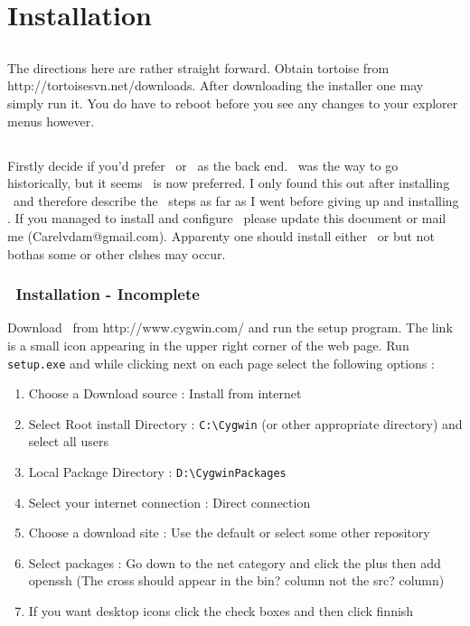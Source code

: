 \section{Installation}

\subsection{\svn}

The directions here are rather straight forward. Obtain tortoise from http://tortoisesvn.net/downloads. After downloading the installer one may simply run it. You do have to reboot before you see any changes to your explorer menus however.

\subsection{\git}

Firstly decide if you'd prefer \msys\ or \cyg\ as the back end. \cyg\ was the way to go historically, but it seems \msys\ is now preferred. I only found this out after installing \cyg\ and therefore describe the \cyg\ steps as far as I went before giving up and installing \msys. If you managed to install and configure \cyg\ please update this document or mail me (Carelvdam@gmail.com). Apparenty one should install either \cyg\ or \msys but not bothas some or other clshes may occur.

\subsubsection{\cyg\ Installation - Incomplete}

Download \cyg\ from http://www.cygwin.com/ and run the setup program. The link is a small icon appearing in the upper right corner of the web page. Run \verb|setup.exe| and while clicking next on each page select the following options : 
\begin{enumerate}
\item Choose a Download source : Install from internet
\item Select Root install Directory : \verb|C:\Cygwin| (or other appropriate directory) and select all users
\item Local Package Directory : \verb|D:\CygwinPackages|
\item Select your internet connection : Direct connection
\item Choose a download site : Use the default or select some other repository
\item Select packages : Go down to the net category and click the plus then add openssh (The cross should appear in the bin? column not the src? column)
\item If you want desktop icons click the check boxes and then click finnish
\end{enumerate}

